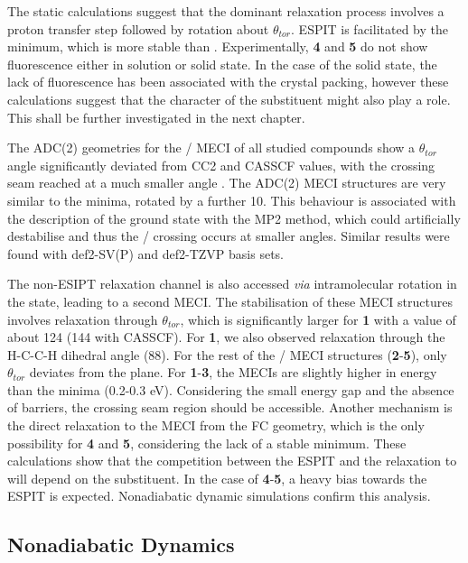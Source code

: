 The static calculations suggest that the dominant relaxation process involves a proton transfer step followed by rotation about $\theta_{tor}$. ESPIT is facilitated by the \Kstar{} minimum, which is more stable than \Estar. Experimentally, \textbf{4} and \textbf{5} do not show fluorescence either in solution or solid state. In the case of the solid state, the lack of fluorescence has been associated with the crystal packing, however these calculations suggest that the character of the substituent might also play a role. This shall be further investigated in the next chapter.

The ADC(2) geometries for the \Kstar{} \sone/\szero{} MECI of all studied compounds show a $\theta_{tor}$ angle significantly deviated from CC2 and CASSCF values, with the crossing seam reached at a much smaller angle . The ADC(2) MECI structures are very similar to the \Kstar{} minima, rotated by a further 10\textdegree{}. This behaviour is associated with the description of the ground state with the MP2 method, which could artificially destabilise \szero{} and thus the \sone/\szero{}  crossing occurs at smaller angles. Similar results were found with def2-SV(P) and def2-TZVP basis sets.

The non-ESIPT relaxation channel is also accessed \textit{via} intramolecular rotation in the \Estar{} state, leading to a second MECI. The stabilisation of these MECI structures involves relaxation through $\theta_{tor}$, which is significantly larger for \textbf{1} with a value of about 124\textdegree{} (144\textdegree{} with CASSCF). For \textbf{1}, we also observed relaxation through the H-C-C-H dihedral angle (88\textdegree{}). For the rest of the \sone/\szero{} MECI structures (\textbf{2}-\textbf{5}), only $\theta_{tor}$ deviates from the plane. For \textbf{1}-\textbf{3}, the \Estar{} MECIs are slightly higher in energy than the \Estar{} minima (0.2-0.3 eV).  Considering the small energy gap and the absence of barriers, the crossing seam region should be accessible. Another mechanism is the direct relaxation to the MECI from the FC geometry, which is the only possibility for \textbf{4} and \textbf{5}, considering the lack of a stable \Estar{} minimum. These calculations show that the competition between the ESPIT and the relaxation to \Estar{} will depend on the substituent. In the case of \textbf{4}-\textbf{5}, a heavy bias towards the ESPIT is expected. Nonadiabatic dynamic simulations confirm this analysis. 
\subsection{Nonadiabatic Dynamics}\label{section: NRdecay_Dynamics}

